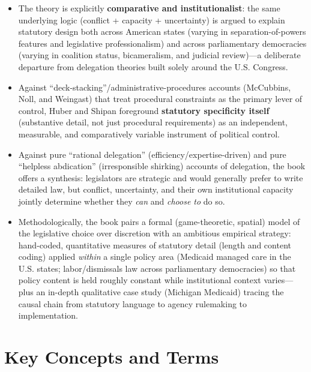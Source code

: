 \documentclass[12pt]{article}
\begin{document}
\begin{itemize}[leftmargin=*, itemsep=4pt]
    \item The theory is explicitly \textbf{comparative and institutionalist}: the same underlying logic (conflict + capacity + uncertainty) is argued to explain statutory design both across American states (varying in separation-of-powers features and legislative professionalism) and across parliamentary democracies (varying in coalition status, bicameralism, and judicial review)---a deliberate departure from delegation theories built solely around the U.S. Congress.
    \item Against ``deck-stacking''/administrative-procedures accounts (McCubbins, Noll, and Weingast) that treat procedural constraints as the primary lever of control, Huber and Shipan foreground \textbf{statutory specificity itself} (substantive detail, not just procedural requirements) as an independent, measurable, and comparatively variable instrument of political control.
    \item Against pure ``rational delegation'' (efficiency/expertise-driven) and pure ``helpless abdication'' (irresponsible shirking) accounts of delegation, the book offers a synthesis: legislators are strategic and would generally prefer to write detailed law, but conflict, uncertainty, and their own institutional capacity jointly determine whether they \emph{can} and \emph{choose to} do so.
    \item Methodologically, the book pairs a formal (game-theoretic, spatial) model of the legislative choice over discretion with an ambitious empirical strategy: hand-coded, quantitative measures of statutory detail (length and content coding) applied \emph{within} a single policy area (Medicaid managed care in the U.S. states; labor/dismissals law across parliamentary democracies) so that policy content is held roughly constant while institutional context varies---plus an in-depth qualitative case study (Michigan Medicaid) tracing the causal chain from statutory language to agency rulemaking to implementation.
\end{itemize}

\section{Key Concepts and Terms}
\end{document}
